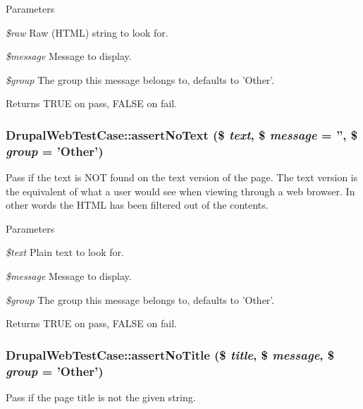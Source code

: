 \begin{DoxyParams}{Parameters}
\item[{\em \$raw}]Raw (HTML) string to look for. \item[{\em \$message}]Message to display. \item[{\em \$group}]The group this message belongs to, defaults to 'Other'. \end{DoxyParams}
\begin{DoxyReturn}{Returns}
TRUE on pass, FALSE on fail. 
\end{DoxyReturn}
\hypertarget{class_drupal_web_test_case_aa2d5a43e1615b89589b7c8b2a2e4f487}{
\subsubsection[{assertNoText}]{\setlength{\rightskip}{0pt plus 5cm}DrupalWebTestCase::assertNoText (\$ {\em text}, \/  \$ {\em message} = {\ttfamily ''}, \/  \$ {\em group} = {\ttfamily 'Other'})}}
\label{class_drupal_web_test_case_aa2d5a43e1615b89589b7c8b2a2e4f487}
Pass if the text is NOT found on the text version of the page. The text version is the equivalent of what a user would see when viewing through a web browser. In other words the HTML has been filtered out of the contents.


\begin{DoxyParams}{Parameters}
\item[{\em \$text}]Plain text to look for. \item[{\em \$message}]Message to display. \item[{\em \$group}]The group this message belongs to, defaults to 'Other'. \end{DoxyParams}
\begin{DoxyReturn}{Returns}
TRUE on pass, FALSE on fail. 
\end{DoxyReturn}
\hypertarget{class_drupal_web_test_case_aa019d62a843ffe740b9456f316838924}{
\subsubsection[{assertNoTitle}]{\setlength{\rightskip}{0pt plus 5cm}DrupalWebTestCase::assertNoTitle (\$ {\em title}, \/  \$ {\em message}, \/  \$ {\em group} = {\ttfamily 'Other'})}}
\label{class_drupal_web_test_case_aa019d62a843ffe740b9456f316838924}
Pass if the page title is not the given string.



